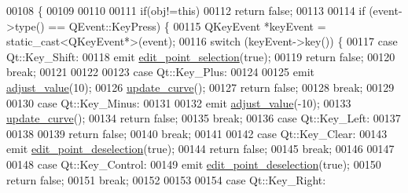 \begin{DoxyCode}
00108 \{
00109 
00110 
00111     \textcolor{keywordflow}{if}(obj!=\textcolor{keyword}{this})
00112         \textcolor{keywordflow}{return} \textcolor{keyword}{false};
00113 
00114         \textcolor{keywordflow}{if} (event->type() == QEvent::KeyPress) \{
00115             QKeyEvent *keyEvent = \textcolor{keyword}{static\_cast<}QKeyEvent*\textcolor{keyword}{>}(event);
00116             \textcolor{keywordflow}{switch} (keyEvent->key()) \{
00117             \textcolor{keywordflow}{case} Qt::Key\_Shift:
00118                     emit \hyperlink{a00004_a9aa2af0c329358fd96f7fb6b7f02bfe1}{edit\_point\_selection}(\textcolor{keyword}{true});
00119                   \textcolor{keywordflow}{return} \textcolor{keyword}{false};
00120                  \textcolor{keywordflow}{break};
00121 
00122 
00123             \textcolor{keywordflow}{case} Qt::Key\_Plus:
00124 
00125                     emit \hyperlink{a00004_a74d292de22b341313df1852cb1033704}{adjust\_value}(10);
00126                     \hyperlink{a00004_a15cbcf5f0a17281468800f47898f60c1}{update\_curve}();
00127                     \textcolor{keywordflow}{return} \textcolor{keyword}{false};
00128                  \textcolor{keywordflow}{break};
00129 
00130             \textcolor{keywordflow}{case} Qt::Key\_Minus:
00131 
00132                     emit \hyperlink{a00004_a74d292de22b341313df1852cb1033704}{adjust\_value}(-10);
00133                     \hyperlink{a00004_a15cbcf5f0a17281468800f47898f60c1}{update\_curve}();
00134                     \textcolor{keywordflow}{return} \textcolor{keyword}{false};
00135                 \textcolor{keywordflow}{break};
00136             \textcolor{keywordflow}{case} Qt::Key\_Left:
00137 
00138 
00139                     \textcolor{keywordflow}{return} \textcolor{keyword}{false};
00140                 \textcolor{keywordflow}{break};
00141 
00142             \textcolor{keywordflow}{case} Qt::Key\_Clear:
00143                     emit \hyperlink{a00004_a2b9629d20c2b97c01bf8486c89fd0148}{edit\_point\_deselection}(\textcolor{keyword}{true});
00144                     \textcolor{keywordflow}{return} \textcolor{keyword}{false};
00145                      \textcolor{keywordflow}{break};
00146 
00147 
00148             \textcolor{keywordflow}{case} Qt::Key\_Control:
00149                     emit \hyperlink{a00004_a2b9629d20c2b97c01bf8486c89fd0148}{edit\_point\_deselection}(\textcolor{keyword}{true});
00150                     \textcolor{keywordflow}{return} \textcolor{keyword}{false};
00151                  \textcolor{keywordflow}{break};
00152 
00153 
00154             \textcolor{keywordflow}{case} Qt::Key\_Right:

\end{DoxyCode}
